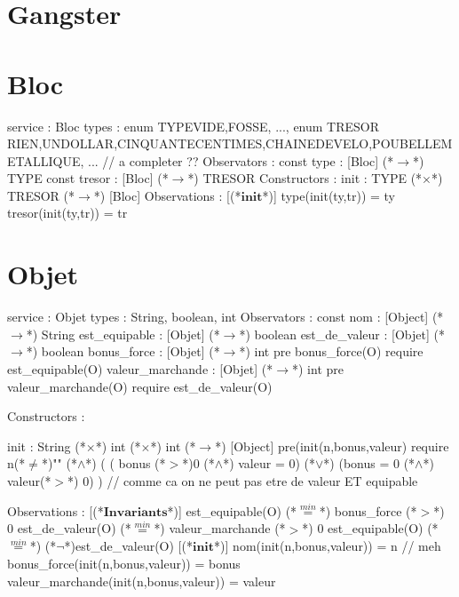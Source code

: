 \documentclass[a4paper, 11pt]{report}
\newcommand{\specB}[1]{\textbf{#1}}
\begin{document}
\section{Gangster}
\begin{Spe}
  
  
\end{Spe}

\section{Bloc}
\begin{Spe}
service : Bloc
types : enum TYPE{VIDE,FOSSE, ...}, enum TRESOR {RIEN,UNDOLLAR,CINQUANTECENTIMES,CHAINEDEVELO,POUBELLEMETALLIQUE,
  ...} // a completer ??
Observators :
      const type : [Bloc] (*$\rightarrow$*) TYPE
      const tresor : [Bloc] (*$\rightarrow$*) TRESOR
Constructors :
      init : TYPE (*$\times$*) TRESOR (*$\rightarrow$*) [Bloc]
Observations :
      [(*$\specB{init}$*)]
            type(init(ty,tr)) = ty
            tresor(init(ty,tr)) = tr
\end{Spe}
 
\section{Objet}
\begin{Spe}


service : Objet 
types : String, boolean, int 
Observators :
	const nom : [Object] (*$\rightarrow$*) String
	est_equipable : [Objet] (*$\rightarrow$*) boolean 
	est_de_valeur : [Objet] (*$\rightarrow$*) boolean
	bonus_force : [Objet] (*$\rightarrow$*) int
		pre bonus_force(O) require est_equipable(O) 
	valeur_marchande : [Objet] (*$\rightarrow$*) int
		pre valeur_marchande(O) require est_de_valeur(O)

Constructors :

	init : String (*$\times$*) int (*$\times$*) int (*$\rightarrow$*) [Object] 
		pre(init(n,bonus,valeur) require n(*$\ne$*)""
                (*$\land$*) ( ( bonus (*$>$*)0 (*$\land$*) valeur = 0)
                (*$\lor$*) (bonus = 0 (*$\land$*) valeur(*$>$*) 0) ) 
                // comme ca on ne peut pas etre de valeur ET equipable 

Observations : 
        [(*$\specB{Invariants}$*)]
	        est_equipable(O) (*$\stackrel{min}{=}$*) bonus_force (*$>$*) 0
	        est_de_valeur(O) (*$\stackrel{min}{=}$*) valeur_marchande (*$>$*) 0
              	est_equipable(O) (*$\stackrel{min}{=}$*) (*$\lnot$*)est_de_valeur(O)
	[(*$\specB{init}$*)]
		nom(init(n,bonus,valeur)) = n // meh 
		bonus_force(init(n,bonus,valeur)) = bonus 
		valeur_marchande(init(n,bonus,valeur)) = valeur 

\end{Spe}
\end{document}
